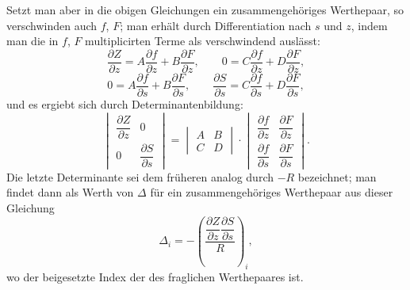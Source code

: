 \documentclass[10pt]{article}
\begin{document}
Setzt man aber in die obigen Gleichungen ein zusammengehöriges Werthepaar, so verschwinden auch $f$, $F$; man erhält durch Differentiation nach $s$ und $z$, indem man die in $f$, $F$ multiplicirten Terme als verschwindend auslässt:
\[
\frac{\partial Z}{\partial z}=A\frac{\partial f}{\partial z}+B\frac{\partial F}{\partial z},\qquad
0=C\frac{\partial f}{\partial z}+D\frac{\partial F}{\partial z},
\]
\[
0=A\frac{\partial f}{\partial s}+B\frac{\partial F}{\partial s},\qquad
\frac{\partial S}{\partial s}=C\frac{\partial f}{\partial s}+D\frac{\partial F}{\partial s},
\]
und es ergiebt sich durch Determinantenbildung:
\[
\begin{vmatrix}
\dfrac{\partial Z}{\partial z}&0\\[0.2em]
0&\dfrac{\partial S}{\partial s}
\end{vmatrix}
=
\begin{vmatrix}A&B\\C&D\end{vmatrix}
\cdot
\begin{vmatrix}
\dfrac{\partial f}{\partial z}&\dfrac{\partial F}{\partial z}\\[0.2em]
\dfrac{\partial f}{\partial s}&\dfrac{\partial F}{\partial s}
\end{vmatrix}.
\]
Die letzte Determinante sei dem früheren analog durch $-R$ bezeichnet; man findet dann als Werth von $\Delta$ für ein zusammengehöriges Werthepaar aus dieser Gleichung
\[
\Delta_i=-\left(\frac{\dfrac{\partial Z}{\partial z}\dfrac{\partial S}{\partial s}}{R}\right)_i,
\]
wo der beigesetzte Index der des fraglichen Werthepaares ist.
\end{document}
